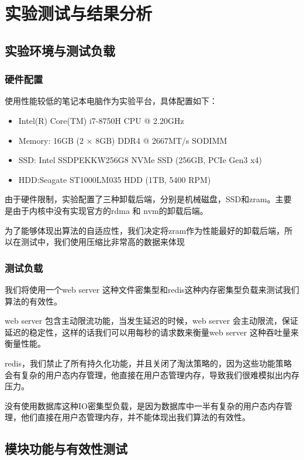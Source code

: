 \chapter{实验测试与结果分析}

\section{实验环境与测试负载}
\subsection{硬件配置}

使用性能较低的笔记本电脑作为实验平台，具体配置如下：
\begin{itemize}
    \item Intel(R) Core(TM) i7-8750H CPU @ 2.20GHz
    \item Memory: 16GB (2 × 8GB) DDR4 @ 2667MT/s SODIMM
    \item SSD: Intel SSDPEKKW256G8 NVMe SSD (256GB, PCIe Gen3 x4) 
    \item HDD:Seagate ST1000LM035 HDD (1TB, 5400 RPM)
\end{itemize}


由于硬件限制，实验配置了三种卸载后端，分别是机械磁盘，SSD和zram。主要是由于内核中没有实现官方的rdma 和 nvm的卸载后端。

为了能够体现出算法的自适应性，我们决定将zram作为性能最好的卸载后端，所以在测试中，我们使用压缩比非常高的数据来体现

\subsection{测试负载}

我们将使用一个web server 这种文件密集型和redis这种内存密集型负载来测试我们算法的有效性。

web server 包含主动限流功能，当发生延迟的时候，web server 会主动限流，保证延迟的稳定性，这样的话我们可以用每秒的请求数来衡量web server 这种吞吐量来衡量性能。

redis，我们禁止了所有持久化功能，并且关闭了淘汰策略的，因为这些功能策略会有复杂的用户态内存管理，他直接在用户态管理内存，导致我们很难模拟出内存压力。

没有使用数据库这种IO密集型负载，是因为数据库中一半有复杂的用户态内存管理，他们直接在用户态管理内存，并不能体现出我们算法的有效性。

\section{模块功能与有效性测试}

